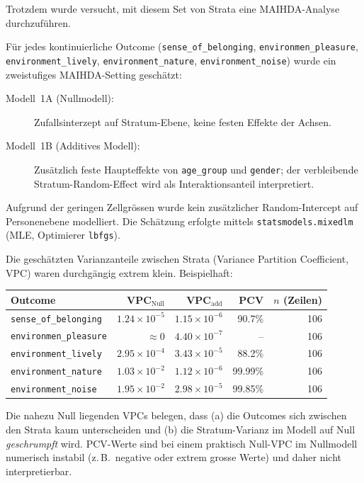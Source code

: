 Trotzdem wurde versucht, mit diesem Set von Strata eine MAIHDA-Analyse durchzuführen.

Für jedes kontinuierliche Outcome (\texttt{sense\_of\_belonging}, \texttt{environmen\_pleasure}, \texttt{environment\_lively}, \texttt{environment\_nature}, \texttt{environment\_noise}) wurde ein zweistufiges MAIHDA-Setting geschätzt:
\begin{description}
    \item[Modell~1A (Nullmodell):] Zufallsinterzept auf Stratum-Ebene, keine festen Effekte der Achsen.
    \item[Modell~1B (Additives Modell):] Zusätzlich feste Haupteffekte von \texttt{age\_group} und \texttt{gender}; der verbleibende Stratum-Random-Effect wird als Interaktionsanteil interpretiert.
\end{description}
Aufgrund der geringen Zellgrössen wurde kein zusätzlicher Random-Intercept auf Personenebene modelliert. Die Schätzung erfolgte mittels \texttt{statsmodels.mixedlm} (MLE, Optimierer \texttt{lbfgs}).


Die geschätzten Varianzanteile zwischen Strata (Variance Partition Coefficient, VPC) waren durchgängig extrem klein. Beispielhaft:

\begin{center}
\begin{tabular}{lrrrr}
\toprule
Outcome & VPC$_{\text{Null}}$ & VPC$_{\text{add}}$ & PCV & $n$ (Zeilen) \\
\midrule
\texttt{sense\_of\_belonging}      & $1.24\times 10^{-5}$ & $1.15\times 10^{-6}$ & 90.7\% & 106 \\
\texttt{environmen\_pleasure}      & $\approx 0$          & $4.40\times 10^{-7}$ & --      & 106 \\
\texttt{environment\_lively}       & $2.95\times 10^{-4}$ & $3.43\times 10^{-5}$ & 88.2\%  & 106 \\
\texttt{environment\_nature}       & $1.03\times 10^{-2}$ & $1.12\times 10^{-6}$ & 99.99\% & 106 \\
\texttt{environment\_noise}        & $1.95\times 10^{-2}$ & $2.98\times 10^{-5}$ & 99.85\% & 106 \\
\bottomrule
\end{tabular}
\end{center}

Die nahezu Null liegenden VPCs belegen, dass (a) die Outcomes sich zwischen den Strata kaum unterscheiden und (b) die Stratum-Varianz im Modell auf Null \emph{geschrumpft} wird. PCV-Werte sind bei einem praktisch Null-VPC im Nullmodell numerisch instabil (z.\,B.\ negative oder extrem grosse Werte) und daher nicht interpretierbar.

